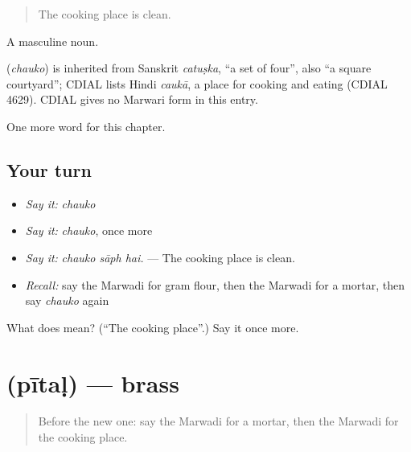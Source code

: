 \begin{quote}
The cooking place is clean.
\end{quote}

A masculine noun.

\begin{cousinweb}
\textbf{} (\emph{chauko}) is inherited from Sanskrit \emph{catuṣka}, \textquotedblleft{}a set of four\textquotedblright{}, also \textquotedblleft{}a square courtyard\textquotedblright{}; CDIAL lists Hindi \emph{caukā}, a place for cooking and eating (CDIAL 4629). CDIAL gives no Marwari form in this entry.
\end{cousinweb}

\begin{grammarlens}[title={What you've built}]
One more word for this chapter.
\end{grammarlens}

\subsection*{Your turn}
\begin{itemize}
\raggedright
  \item \emph{Say it:} \emph{chauko}
  \item \emph{Say it:} \emph{chauko}, once more
  \item \emph{Say it:} \emph{chauko sāph hai.} — The cooking place is clean.
  \item \emph{Recall:} say the Marwadi for gram flour, then the Marwadi for a mortar, then say \emph{chauko} again
\end{itemize}

\begin{tcolorbox}[breakable,colback=teal!4,colframe=teal!35!black,title={Before you move on}]
What does  mean? (\textquotedblleft{}The cooking place\textquotedblright{}.) Say it once more.
\end{tcolorbox}
\section[\texorpdfstring{\mw{पीतळ} (pītaḷ)}{पीतळ (pītaḷ)}]{ (pītaḷ) — brass}

\label{lesson:MW-C184-pital}



\begin{quote}
Before the new one: say the Marwadi for a mortar, then the Marwadi for the cooking place.
\end{quote}

